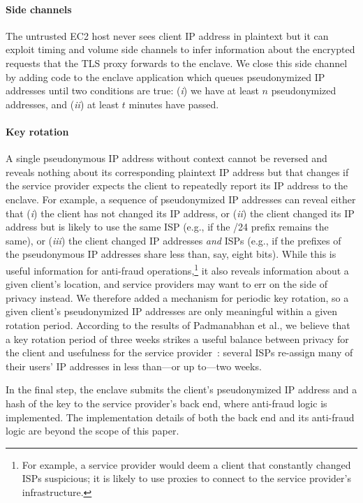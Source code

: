 \paragraph{Side channels}
The untrusted EC2 host never sees client IP address in plaintext
but it can exploit timing and volume side channels to infer information about
the encrypted requests that the TLS proxy forwards to the enclave.  We close
this side channel by adding code to the enclave application which queues
pseudonymized IP addresses until two conditions are true: (\emph{i}) we have at
least $n$ pseudonymized addresses, and (\emph{ii}) at least $t$ minutes have
passed.

\paragraph{Key rotation} A single pseudonymous IP address without context cannot
be reversed and reveals nothing about its corresponding plaintext IP address but
that changes if the service provider expects the client to repeatedly report its
IP address to the enclave.  For example, a sequence of pseudonymized IP
addresses can reveal either that (\emph{i}) the client has not changed its IP
address, or (\emph{ii}) the client changed its IP address but is likely to use
the same ISP (e.g., if the /24 prefix remains the same), or (\emph{iii}) the
client changed IP addresses \emph{and} ISPs (e.g., if the prefixes of the
pseudonymous IP addresses share less than, say, eight bits).  While this is
useful information for anti-fraud operations,\footnote{For example, a service
provider would deem a client that constantly changed ISPs suspicious; it is
likely to use proxies to connect to the service provider's infrastructure.} it
also reveals information about a given client's location, and service providers
may want to err on the side of privacy instead.  We therefore added a mechanism
for periodic key rotation, so a given client's pseudonymized IP addresses are
only meaningful within a given rotation period.  According to the results of
Padmanabhan et al., we believe that a key rotation period of three weeks strikes
a useful balance between privacy for the client and usefulness for the service
provider~\cite[\S~3.2]{Padmanabhan20a}: several ISPs re-assign many of their
users' IP addresses in less than---or up to---two weeks.

In the final step, the enclave submits the client's pseudonymized IP address and
a hash of the key to the service provider's back end, where anti-fraud logic is
implemented.  The implementation details of both the back end and its anti-fraud
logic are beyond the scope of this paper.


